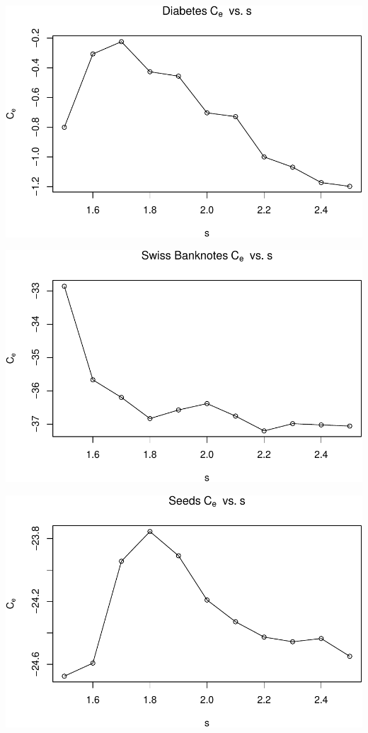 \documentclass[]{article}
\begin{document}
\begin{center}\includegraphics[width=1\linewidth]{Report_files/figure-latex/unnamed-chunk-26-3} \end{center}

\begin{center}\includegraphics[width=1\linewidth]{Report_files/figure-latex/unnamed-chunk-26-4} \end{center}

\begin{center}\includegraphics[width=1\linewidth]{Report_files/figure-latex/unnamed-chunk-26-5} \end{center}
\end{document}
